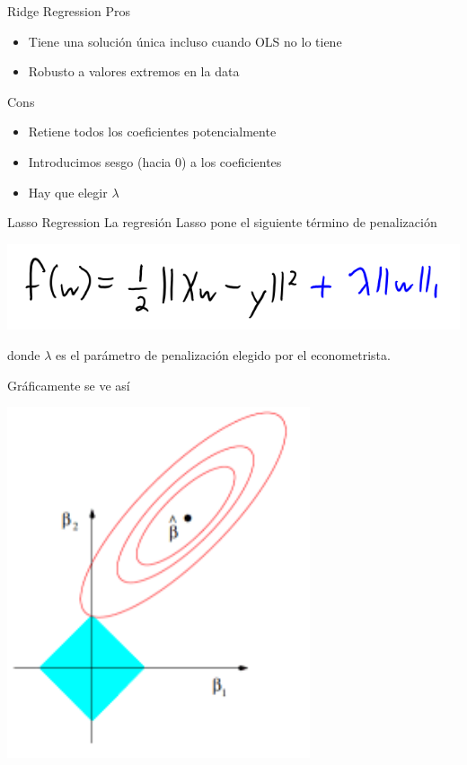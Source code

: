 \documentclass[11pt,handout,aspectratio=169]{beamer}
\begin{document}
\begin{frame}{Ridge Regression}
Pros
\begin{itemize}
\item Tiene una solución única incluso cuando OLS no lo tiene
\item Robusto a valores extremos en la data
\end{itemize}
\vspace{0.8cm}
Cons 
\begin{itemize}
\item Retiene todos los coeficientes potencialmente
\item Introducimos sesgo (hacia 0) a los coeficientes
\item Hay que elegir $\lambda$
\end{itemize}

\end{frame}


\begin{frame}{Lasso Regression}
La regresión Lasso pone el siguiente término de penalización
\begin{center}
\includegraphics[scale=0.5]{l1_regularization.png}
\end{center}
donde $\lambda$ es el parámetro de penalización elegido por el econometrista. 

Gráficamente se ve así
\begin{center}
\includegraphics[scale=0.5]{lasso_minimization.png}
\end{center}

\end{frame}
\end{document}
